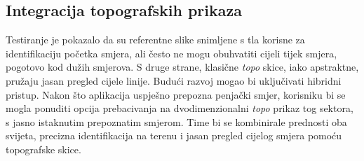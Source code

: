 \subsection{Integracija topografskih prikaza}

Testiranje je pokazalo da su referentne slike snimljene s tla korisne za identifikaciju početka smjera, ali često ne mogu obuhvatiti cijeli tijek smjera, pogotovo kod dužih smjerova. S druge strane, klasične \textit{topo} skice, iako apstraktne, pružaju jasan pregled cijele linije. Budući razvoj mogao bi uključivati hibridni pristup. Nakon što aplikacija uspješno prepozna penjački smjer, korisniku bi se mogla ponuditi opcija prebacivanja na dvodimenzionalni \textit{topo} prikaz tog sektora, s jasno istaknutim prepoznatim smjerom. Time bi se kombinirale prednosti oba svijeta, precizna identifikacija na terenu i jasan pregled cijelog smjera pomoću topografske skice.

